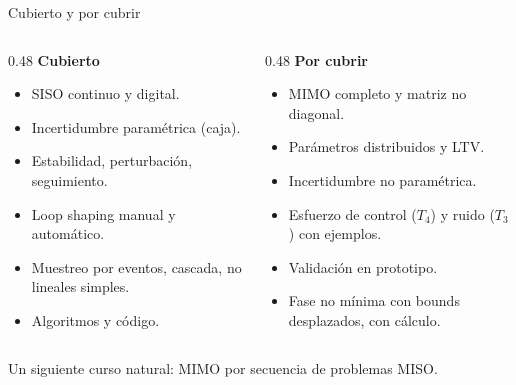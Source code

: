 \documentclass[aspectratio=169,11pt]{beamer}
\begin{document}
\begin{frame}{Cubierto y por cubrir}
  \small
  \begin{columns}[T]
  \begin{column}{0.48\textwidth}
    \textbf{Cubierto}
    \begin{itemize}
      \item SISO continuo y digital.
      \item Incertidumbre paramétrica (caja).
      \item Estabilidad, perturbación, seguimiento.
      \item Loop shaping manual y automático.
      \item Muestreo por eventos, cascada, no lineales simples.
      \item Algoritmos y código.
    \end{itemize}
  \end{column}
  \begin{column}{0.48\textwidth}
    \textbf{Por cubrir}
    \begin{itemize}
      \item MIMO completo y matriz no diagonal.
      \item Parámetros distribuidos y LTV.
      \item Incertidumbre no paramétrica.
      \item Esfuerzo de control ($T_4$) y ruido ($T_3$) con ejemplos.
      \item Validación en prototipo.
      \item Fase no mínima con bounds desplazados, con cálculo.
    \end{itemize}
  \end{column}
  \end{columns}
  \vspace{4pt}
  \footnotesize Un siguiente curso natural: MIMO por secuencia de problemas MISO.
\end{frame}
\end{document}
